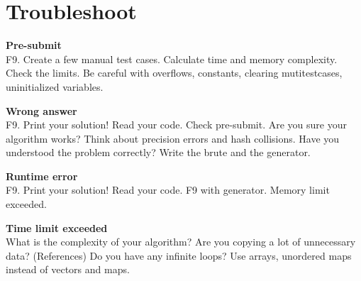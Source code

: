 \section*{Troubleshoot}
\textbf{Pre-submit}\\
F9.
Create a few manual test cases.
Calculate time and memory complexity. Check the limits.
Be careful with overflows, constants,
clearing mutitestcases, uninitialized variables.

\textbf{Wrong answer}\\
F9.
Print your solution!
Read your code.
Check pre-submit.
Are you sure your algorithm works?
Think about precision errors and hash collisions.
Have you understood the problem correctly?
Write the brute and the generator.

\textbf{Runtime error}\\
F9.
Print your solution!
Read your code.
F9 with generator.
Memory limit exceeded.

\textbf{Time limit exceeded}\\
What is the complexity of your algorithm?
Are you copying a lot of unnecessary data? (References)
Do you have any infinite loops?
Use arrays, unordered maps instead of vectors and maps.